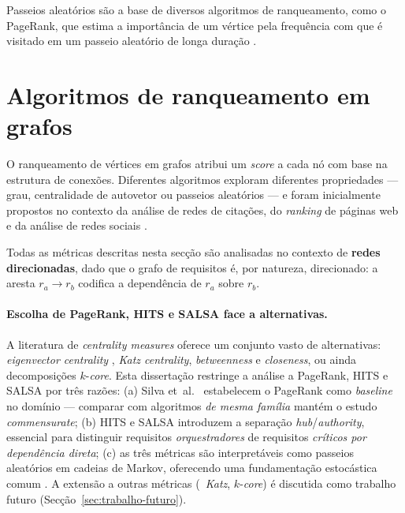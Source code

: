 Passeios aleatórios são a base de diversos algoritmos de ranqueamento,
como o PageRank, que estima a importância de um vértice pela frequência
com que é visitado em um passeio aleatório de longa duração
\parencite{page1999, masuda2017}.

\section{Algoritmos de ranqueamento em grafos}
\label{sec:algoritmos}

O ranqueamento de vértices em grafos atribui um \emph{score} a cada
nó com base na estrutura de conexões. Diferentes algoritmos exploram
diferentes propriedades --- grau, centralidade de autovetor ou
passeios aleatórios --- e foram inicialmente propostos no contexto da
análise de redes de citações, do \emph{ranking} de páginas web e da
análise de redes sociais \parencite{page1999, kleinberg1999, lempel2001}.

\begin{notebox}[Importante]
    Todas as métricas descritas nesta secção são analisadas no
    contexto de \textbf{redes direcionadas}, dado que o grafo de
    requisitos é, por natureza, direcionado: a aresta
    $r_a \rightarrow r_b$ codifica a dependência de $r_a$ sobre $r_b$.
\end{notebox}

\paragraph{Escolha de PageRank, HITS e SALSA face a alternativas.}
A literatura de \emph{centrality measures} oferece um conjunto vasto
de alternativas: \emph{eigenvector centrality} \parencite{newman2010},
\emph{Katz centrality}, \emph{betweenness} e \emph{closeness}, ou
ainda decomposições $k$-\emph{core}. Esta dissertação restringe a
análise a PageRank, HITS e SALSA por três razões: (a) Silva et~al.\
\parencite{silva2018} estabelecem o PageRank como \emph{baseline} no
domínio --- comparar com algoritmos \emph{de mesma família} mantém o
estudo \emph{commensurate}; (b) HITS e SALSA introduzem a separação
\emph{hub}/\emph{authority}, essencial para distinguir requisitos
\emph{orquestradores} de requisitos \emph{críticos por dependência
direta}; (c) as três métricas são interpretáveis como passeios
aleatórios em cadeias de Markov, oferecendo uma fundamentação
estocástica comum \parencite{ding2002}. A extensão a outras métricas
(\eg\ \emph{Katz}, $k$-\emph{core}) é discutida como trabalho futuro
(Secção~\ref{sec:trabalho-futuro}).

